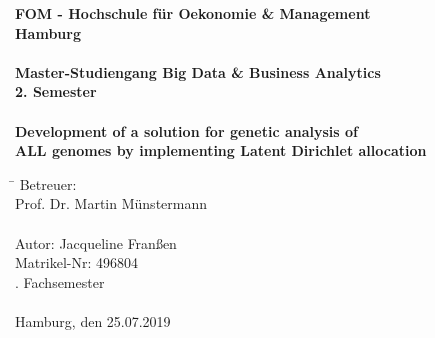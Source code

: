 		\begin{titlepage}
			\begin{center}
					\textbf{\large FOM - Hochschule für Oekonomie \& Management \\
						Hamburg \\
						\ \\
						Master-Studiengang Big Data \& Business Analytics \\
						2. Semester \\
						\ \\
						Development of a solution for genetic analysis of \\
						ALL genomes by implementing Latent Dirichlet allocation\\ 
						}
				
				\begin{tabbing}
					\hspace{2.5cm}\=\kill
					Betreuer: \>  \\
					\> Prof. Dr. Martin Münstermann \\
					\ \\
					Autor: \> Jacqueline Franßen \\
					\> Matrikel-Nr: 496804 \\
					. Fachsemester \\
					\ \\
					Hamburg, den 25.07.2019
				\end{tabbing}
			\end{center}
		\end{titlepage}

%

			\setcounter{tocdepth}{3}
			\setcounter{secnumdepth}{3}		
			\thispagestyle{empty}
			\tableofcontents
			\newpage
			\listoffigures
			\listoftables
			\printglossary[type=acronym,style=listdotted,title=Abkürzungsverzeichnis,toctitle=Abkürzungsverzeichnis] 
			\newpage
			\thispagestyle{empty}